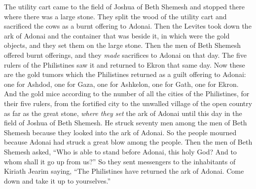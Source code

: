 \begin{biblechapter}
\verse The utility cart came to the field of Joshua of Beth Shemesh and stopped there where there was a large stone. They split the wood of the utility cart and sacrificed the cows as a burnt offering to Adonai.
\verse Then the Levites took down the ark of Adonai and the container that was beside it, in which were the gold objects, and they set them on the large stone. Then the men of Beth Shemesh offered burnt offerings, and they \textit{made} sacrifices to Adonai on that day.
\verse The five rulers of the Philistines saw it and returned to Ekron that same day.
\verse Now these are the gold tumors which the Philistines returned as a guilt offering to Adonai: one for Ashdod, one for Gaza, one for Ashkelon, one for Gath, one for Ekron.
\verse And the gold mice according to the number of all the cities of the Philistines, for their five rulers, from the fortified city to the unwalled village of the open country as far as the great stone, \textit{where they set} the ark of Adonai until this day in the field of Joshua of Beth Shemesh.
\verse He struck seventy men among the men of Beth Shemesh because they looked into the ark of Adonai. So the people mourned because Adonai had struck a great blow among the people.
\verse Then the men of Beth Shemesh asked, “Who is able to stand before Adonai, this holy God? And to whom shall it go up from us?”
\verse So they sent messengers to the inhabitants of Kiriath Jearim saying, “The Philistines have returned the ark of Adonai. Come down and take it up to yourselves.”
\end{biblechapter}


